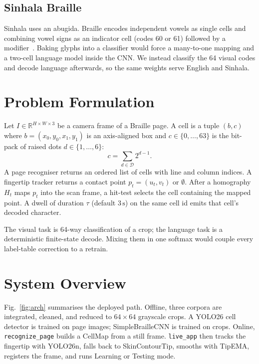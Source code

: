 \documentclass[conference]{IEEEtran}
\begin{document}
\subsection{Sinhala Braille}
Sinhala uses an abugida. Braille encodes independent vowels as single
cells and combining vowel signs as an indicator cell (codes 60 or 61)
followed by a modifier~\cite{unicode-sinhala}. Baking glyphs into a
classifier would force a many-to-one mapping and a two-cell language
model inside the CNN. We instead classify the 64 visual codes and decode
language afterwards, so the same weights serve English and Sinhala.

\section{Problem Formulation}
\label{sec:problem}

Let $I \in \mathbb{R}^{H\times W\times 3}$ be a camera frame of a Braille
page. A cell is a tuple $(b, c)$ where $b=(x_0,y_0,x_1,y_1)$ is an
axis-aligned box and $c\in\{0,\ldots,63\}$ is the bit-pack of raised
dots $d\in\{1,\ldots,6\}$:
\begin{equation}
c = \sum_{d \in \mathcal{D}} 2^{d-1}.
\label{eq:code}
\end{equation}
A page recogniser returns an ordered list of cells with line and column
indices. A fingertip tracker returns a contact point $p_t=(u_t,v_t)$ or
$\emptyset$. After a homography $H_t$ maps $p_t$ into the scan frame, a
hit-test selects the cell containing the mapped point. A dwell of
duration $\tau$ (default $3\,\mathrm{s}$) on the same cell id emits that
cell's decoded character.

The visual task is 64-way classification of a crop; the language task is
a deterministic finite-state decode. Mixing them in one softmax would
couple every label-table correction to a retrain.

\section{System Overview}
\label{sec:overview}

Fig.~\ref{fig:arch} summarises the deployed path. Offline, three
corpora are integrated, cleaned, and reduced to $64\times 64$ grayscale
crops. A YOLO26 cell detector is trained on page images; SimpleBrailleCNN
is trained on crops. Online, \texttt{recognize\_page} builds a CellMap
from a still frame. \texttt{live\_app} then tracks the fingertip with
YOLO26n, falls back to SkinContourTip, smooths with TipEMA, registers
the frame, and runs Learning or Testing mode.
\end{document}
